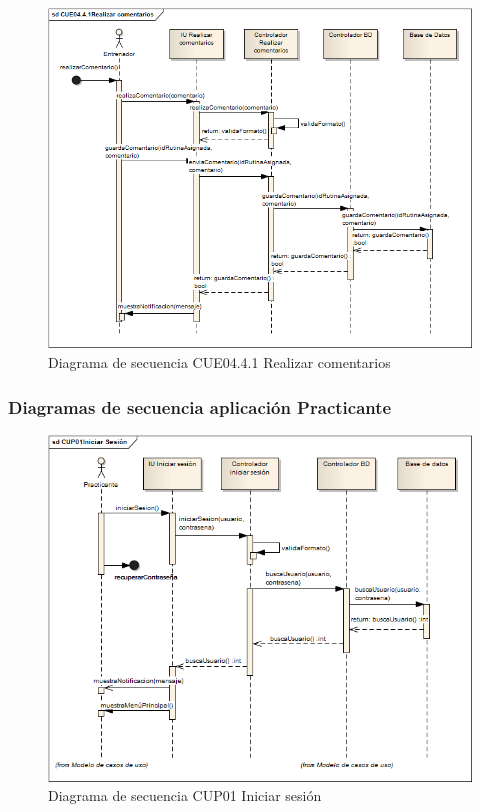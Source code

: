 \begin{figure}[H]
	\begin{center}
		\includegraphics[scale=0.6]{./Figuras/Secuencias/CUE04_4_1Realizar_comentarios}
	\end{center}
	\caption{Diagrama de secuencia CUE04.4.1 Realizar comentarios}
	\label{fig:SE_CUE0441}
\end{figure}

\subsubsection{Diagramas de secuencia aplicación Practicante}

\begin{figure}[H]
	\begin{center}
		\includegraphics[scale=0.7]{./Figuras/Secuencias/CUP01Iniciar_sesion}
	\end{center}
	\caption{Diagrama de secuencia CUP01 Iniciar sesión}
	\label{fig:SE_CUP01}
\end{figure}

